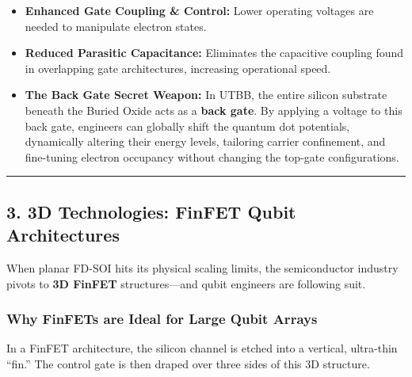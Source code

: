 \documentclass[
]{article}
\providecommand{\tightlist}{%
  \setlength{\itemsep}{0pt}\setlength{\parskip}{0pt}}
\begin{document}
\begin{itemize}
\tightlist
\item
  \textbf{Enhanced Gate Coupling \& Control:} Lower operating voltages
  are needed to manipulate electron states.
\item
  \textbf{Reduced Parasitic Capacitance:} Eliminates the capacitive
  coupling found in overlapping gate architectures, increasing
  operational speed.
\item
  \textbf{The Back Gate Secret Weapon:} In UTBB, the entire silicon
  substrate beneath the Buried Oxide acts as a \textbf{back gate}. By
  applying a voltage to this back gate, engineers can globally shift the
  quantum dot potentials, dynamically altering their energy levels,
  tailoring carrier confinement, and fine-tuning electron occupancy
  without changing the top-gate configurations.
\end{itemize}

\begin{center}\rule{0.5\linewidth}{0.5pt}\end{center}

\subsection{3. 3D Technologies: FinFET Qubit
Architectures}\label{d-technologies-finfet-qubit-architectures}

When planar FD-SOI hits its physical scaling limits, the semiconductor
industry pivots to \textbf{3D FinFET} structures---and qubit engineers
are following suit.

\subsubsection{Why FinFETs are Ideal for Large Qubit
Arrays}\label{why-finfets-are-ideal-for-large-qubit-arrays}

In a FinFET architecture, the silicon channel is etched into a vertical,
ultra-thin ``fin.'' The control gate is then draped over three sides of
this 3D structure.
\end{document}
